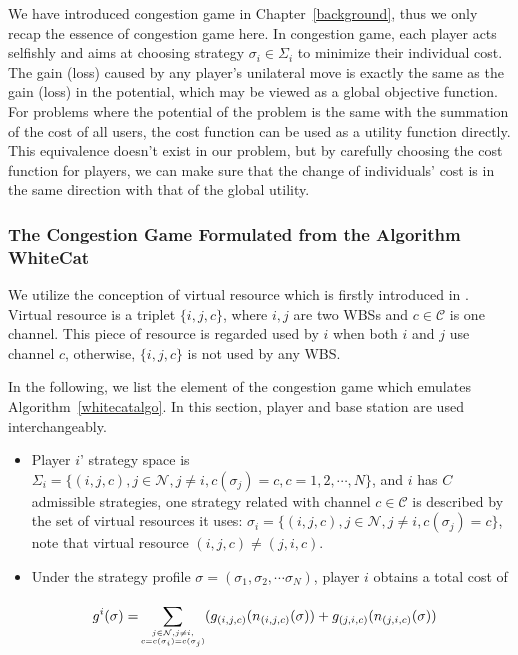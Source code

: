 %
%
We have introduced congestion game in Chapter~\ref{background}, thus we only recap the essence of congestion game here.
In congestion game, each player acts selfishly and aims at choosing strategy $\sigma_i\in \Sigma_i$ to minimize their individual cost.
The gain (loss) caused by any player's unilateral move is exactly the same as the gain (loss) in the potential, which may be viewed as a global objective function.
For problems where the potential of the problem is the same with the summation of the cost of all users, the cost function can be used as a utility function directly.
This equivalence doesn't exist in our problem, but by carefully choosing the cost function for players, we can make sure that the change of individuals' cost is in the same direction with that of the global utility.



\subsubsection*{The Congestion Game Formulated from the Algorithm WhiteCat}
\label{gameforproblem}
We utilize the conception of virtual resource which is firstly introduced in \cite{allerton08_liu}. 
Virtual resource is a triplet $\{i, j, c\}$, where $i,j$ are two WBSs and $c\in \mathcal{C}$ is one channel.
This piece of resource is regarded used by $i$ when both $i$ and $j$ use channel $c$, otherwise, $\{i, j, c\}$ is not used by any WBS.

In the following, we list the element of the congestion game which emulates Algorithm~\ref{whitecatalgo}.
In this section, player and base station are used interchangeably.

\begin{itemize}
\item Player $i$' strategy space is $\Sigma_i=\{(i,j,c), j\in \mathcal{N}, j\ne i, c(\sigma_j)=c, c=1,2,\cdots,N\}$, and $i$ has $C$ admissible strategies, one strategy related with channel $c\in\mathcal{C}$ is described by the set of virtual resources it uses: $\sigma_i=\{(i,j,c), j\in \mathcal{N}, j\ne i, c(\sigma_j)=c\}$, note that virtual resource $(i,j,c)\neq(j,i,c)$.

\item Under the strategy profile $\sigma=(\sigma_1, \sigma_2, \cdots \sigma_N)$, player $i$ obtains a total cost of 

	\begin{equation}
\label{6}
		\begin{split}
		g^i(\sigma)=
		& \sum\limits^{}_{\tiny\substack{j\in \mathcal{N},j\neq i,\\ c=c(\sigma_i)=c(\sigma_j)}} (g_{(i,j,c)}(n_{(i,j,c)}(\sigma))+g_{(j,i,c)}(n_{(j,i,c)}(\sigma))
		\end{split}
		\end{equation}
\end{itemize}

